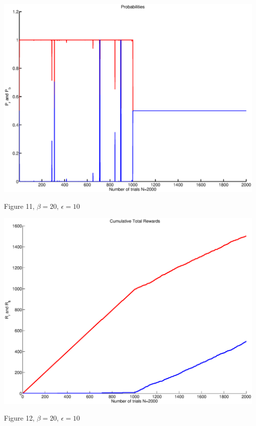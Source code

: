 \documentclass{article}
\begin{document}
\begin{center}
\includegraphics[width=\textwidth]{prob4.eps}
\begin{footnotesize}
 Figure 11, $\beta=20$, $\epsilon=10$
\end{footnotesize}
\end{center}

\begin{center}
\includegraphics[width=\textwidth]{rew4.eps}
\begin{footnotesize}
 Figure 12, $\beta=20$, $\epsilon=10$
\end{footnotesize}
\end{center}
\end{document}
